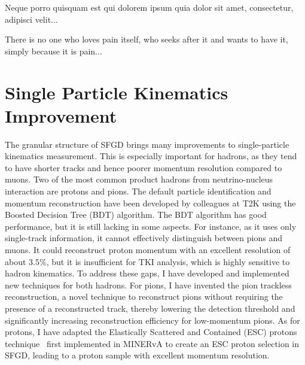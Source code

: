 \begin{savequote}[8cm]
\textlatin{Neque porro quisquam est qui dolorem ipsum quia dolor sit amet, consectetur, adipisci velit...}

There is no one who loves pain itself, who seeks after it and wants to have it, simply because it is pain...
\end{savequote}

\chapter{\label{ch:4-spk}Single Particle Kinematics Improvement} 

\minitoc
   The granular structure of SFGD brings many improvements to single-particle kinematics measurement. 
   This is especially important for hadrons, as they tend to have shorter tracks and hence poorer momentum resolution compared to muons. 
   Two of the most common product hadrons from neutrino-nucleus interaction are protons and pions. 
   The default particle identification and momentum reconstruction have been developed by colleagues at T2K using the Boosted Decision Tree (BDT) algorithm. The BDT algorithm has good performance, but it is still lacking in some aspects.
   For instance, as it uses only single-track information, it cannot effectively distinguish between pions and muons. 
   It could reconstruct proton momentum with an excellent resolution of about $3.5\%$, but it is insufficient for TKI analysis, which is highly sensitive to hadron kinematics. 
   To address these gaps, I have developed and implemented new techniques for both hadrons. 
   For pions, I have invented the pion trackless reconstruction, a novel technique to reconstruct pions without requiring the presence of a reconstructed track, thereby lowering the detection threshold and significantly increasing reconstruction efficiency for low-momentum pions. 
   As for protons, I have adapted the Elastically Scattered and Contained (ESC) protons technique~\cite{Lu:2016mjf} first implemented in MINERvA to create an ESC proton selection in SFGD, leading to a proton sample with excellent momentum resolution. 
   
